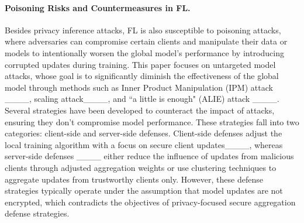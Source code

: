 \paragraph{Poisoning Risks and Countermeasures in FL.}

Besides privacy inference attacks, FL is also susceptible to poisoning attacks, where adversaries can compromise certain clients and manipulate their data or models to intentionally worsen the global model's performance by introducing corrupted updates during training.
This paper focuses on untargeted model attacks, whose goal is to significantly diminish the effectiveness of the global model through methods such as Inner Product Manipulation (IPM) attack ____, scaling attack____, and ``a little is enough" (ALIE) attack ____. 
Several strategies have been developed to counteract the impact of attacks, ensuring they don't compromise model performance. 
These strategies fall into two categories: client-side and server-side defenses. Client-side defenses adjust the local training algorithm with a focus on secure client updates____, whereas server-side defenses ____ either reduce the influence of updates from malicious clients through adjusted aggregation weights or use clustering techniques to aggregate updates from trustworthy clients only.
However, these defense strategies typically operate under the assumption that model updates are not encrypted, which contradicts the objectives of privacy-focused secure aggregation defense strategies.




